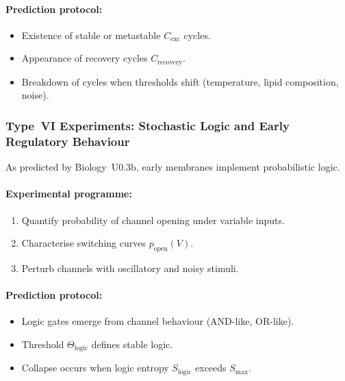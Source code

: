 \paragraph{Prediction protocol:}

\begin{itemize}
    \item Existence of stable or metastable $C_{\mathrm{exc}}$ cycles.
    \item Appearance of recovery cycles $C_{\mathrm{recovery}}$.
    \item Breakdown of cycles when thresholds shift
          (temperature, lipid composition, noise).
\end{itemize}



\subsubsection{Type~VI Experiments: Stochastic Logic and Early Regulatory Behaviour}

As predicted by Biology~U0.3b, early membranes implement probabilistic logic.

\paragraph{Experimental programme:}

\begin{enumerate}
    \item Quantify probability of channel opening under variable inputs.
    \item Characterise switching curves $p_{\mathrm{open}}(V)$.
    \item Perturb channels with oscillatory and noisy stimuli.
\end{enumerate}

\paragraph{Prediction protocol:}

\begin{itemize}
    \item Logic gates emerge from channel behaviour (AND-like, OR-like).
    \item Threshold $\Theta_{\mathrm{logic}}$ defines stable logic.
    \item Collapse occurs when logic entropy $S_{\mathrm{logic}}$
          exceeds $S_{\max}$.
\end{itemize}



